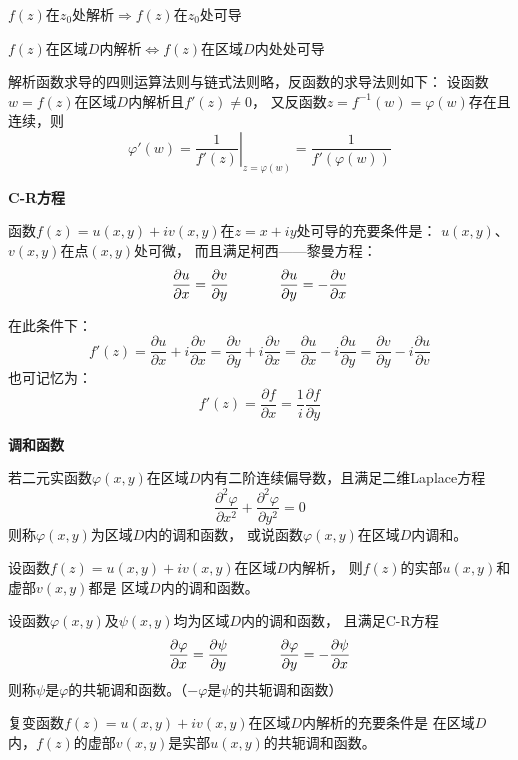\documentclass[a4paper,12pt]{article}
\begin{document}
\begin{center}
    $f\left(z\right)$在$z_0$处解析$\Longrightarrow$$f\left(z\right)$在$z_0$处可导

    $f\left(z\right)$在区域$D$内解析$\Longleftrightarrow$$f\left(z\right)$在区域$D$内处处可导
\end{center}

解析函数求导的四则运算法则与链式法则略，反函数的求导法则如下：
设函数$w=f\left(z\right)$在区域$D$内解析且$f'\left(z\right)\ne0$，
又反函数$z=f^{-1}\left(w\right)=\varphi\left(w\right)$存在且连续，则
$$
\varphi'\left(w\right)=\left.\frac1{f'\left(z\right)}\right|_{z=\varphi\left(w\right)}
=\frac1{f'\left(\varphi\left(w\right)\right)}
$$

\noindent
\textbf{C-R方程}

函数$f\left(z\right)=u\left(x,y\right)+iv\left(x,y\right)$在$z=x+iy$处可导的充要条件是：
$u\left(x,y\right)$、$v\left(x,y\right)$在点$\left(x,y\right)$处可微，
而且满足柯西——黎曼方程：
$$
\frac{\partial u}{\partial x}=\frac{\partial v}{\partial y}\kern 36pt
\frac{\partial u}{\partial y}=-\frac{\partial v}{\partial x}
$$

在此条件下：
$$
f'\left(z\right)=\frac{\partial u}{\partial x}+i\frac{\partial v}{\partial x}
=\frac{\partial v}{\partial y}+i\frac{\partial v}{\partial x}
=\frac{\partial u}{\partial x}-i\frac{\partial u}{\partial y}
=\frac{\partial v}{\partial y}-i\frac{\partial u}{\partial v}
$$
也可记忆为：
$$
f'\left(z\right)=\frac{\partial f}{\partial x}=\frac1i\frac{\partial f}{\partial y}
$$

\noindent
\textbf{调和函数}

若二元实函数$\varphi\left(x,y\right)$在区域$D$内有二阶连续偏导数，且满足二维Laplace方程
$$
\frac{\partial^2\varphi}{\partial x^2}+\frac{\partial^2\varphi}{\partial y^2}=0
$$
则称$\varphi\left(x,y\right)$为区域$D$内的调和函数，
或说函数$\varphi\left(x,y\right)$在区域$D$内调和。

设函数$f\left(z\right)=u\left(x,y\right)+iv\left(x,y\right)$在区域$D$内解析，
则$f\left(z\right)$的实部$u\left(x,y\right)$和虚部$v\left(x,y\right)$都是
区域$D$内的调和函数。

设函数$\varphi\left(x,y\right)$及$\psi\left(x,y\right)$均为区域$D$内的调和函数，
且满足C-R方程
$$
\frac{\partial\varphi}{\partial x}=\frac{\partial\psi}{\partial y}\kern 36pt
\frac{\partial\varphi}{\partial y}=-\frac{\partial\psi}{\partial x}
$$
则称$\psi$是$\varphi$的共轭调和函数。（$-\varphi$是$\psi$的共轭调和函数）

复变函数$f\left(z\right)=u\left(x,y\right)+iv\left(x,y\right)$在区域$D$内解析的充要条件是
在区域$D$内，$f\left(z\right)$的虚部$v\left(x,y\right)$是实部$u\left(x,y\right)$的共轭调和函数。
\end{document}
